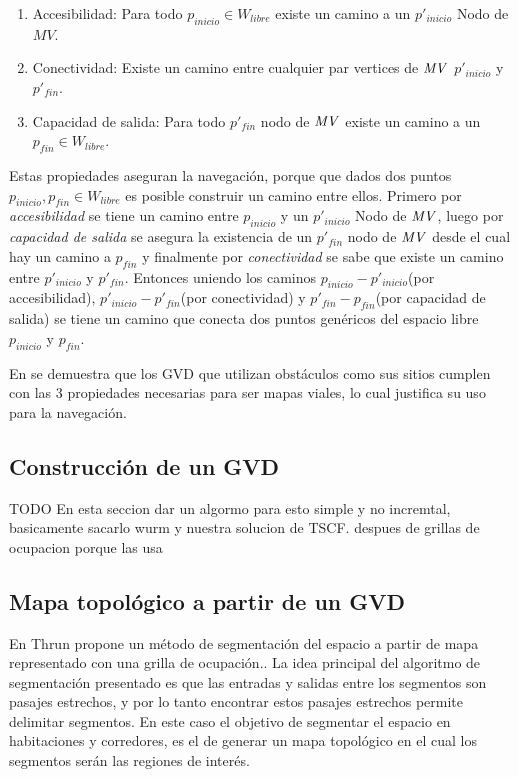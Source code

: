 \begin{enumerate}
\item Accesibilidad: Para todo $p_{inicio} \in W_{libre}$ existe un camino a un $p'_{inicio}$ Nodo de $MV$.
\item Conectividad: Existe un camino entre cualquier par vertices de $\mathit{MV}$ $p'_{inicio}$ y $p'_{fin}$.
\item Capacidad de salida: Para todo $p'_{fin}$ nodo de $\mathit{MV}$ existe un camino a un $p_{fin} \in W_{libre}$.
\end{enumerate}

Estas propiedades aseguran la navegación, porque que dados dos puntos $p_{inicio},p_{fin}\in W_{libre}$ es posible construir un camino entre ellos. Primero por \emph{accesibilidad} se tiene un camino entre $p_{inicio}$ y un $p'_{inicio}$ Nodo de $\mathit{MV}$, luego por \emph{capacidad de salida} se asegura la existencia de un  $p'_{fin}$ nodo de $\mathit{MV}$ desde el cual hay un camino a $p_{fin}$ y finalmente por \emph{conectividad} se sabe que existe un camino entre $p'_{inicio}$ y $p'_{fin}$. Entonces uniendo los caminos $p_{inicio} - p'_{inicio}$(por accesibilidad), $p'_{inicio} - p'_{fin}$(por conectividad) y $p'_{fin} - p_{fin}$(por capacidad de salida) se tiene un camino que conecta dos puntos genéricos del espacio libre $p_{inicio}$ y $p_{fin}$.

En \cite{choset2005principles} se demuestra que los GVD que utilizan obstáculos como sus sitios cumplen con las 3 propiedades necesarias para ser mapas viales, lo cual justifica su uso para la navegación.




\subsection{Construcción de un GVD} 
TODO
En esta seccion dar un algormo para esto simple y no incremtal, basicamente sacarlo wurm y nuestra solucion de TSCF.
despues de grillas de ocupacion porque las usa

\subsection{Mapa topológico a partir de un GVD}
En \cite{Thrun1998} Thrun propone un método de segmentación del espacio a partir de mapa representado con una grilla de ocupación.. La idea principal del algoritmo de segmentación presentado es que las entradas y salidas entre los segmentos son pasajes estrechos, y por lo tanto encontrar estos pasajes estrechos permite delimitar segmentos. En este caso el objetivo de segmentar el espacio en habitaciones y corredores, es el de generar un mapa topológico en el cual los segmentos serán las regiones de interés.

